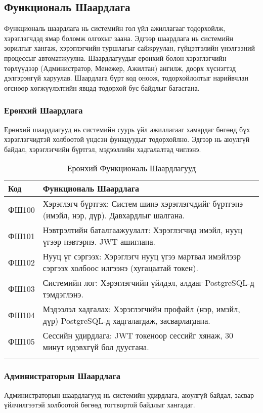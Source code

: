 \documentclass[a4paper]{report} %
\begin{document}
\subsection{Функциональ Шаардлага}
Функциональ шаардлага нь системийн гол үйл ажиллагааг тодорхойлж, хэрэглэгчдэд ямар боломж олгохыг заана. Эдгээр шаардлага нь системийн зорилгыг хангаж, хэрэглэгчийн туршлагыг сайжруулан, гүйцэтгэлийн үнэлгээний процессыг автоматжуулна. Шаардлагуудыг ерөнхий болон хэрэглэгчийн төрлүүдээр (Администратор, Менежер, Ажилтан) ангилж, доорх хүснэгтэд дэлгэрэнгүй харуулав. Шаардлага бүрт код оноож, тодорхойлолтыг нарийвчлан өгснөөр хөгжүүлэлтийн явцад тодорхой бус байдлыг багасгана.

\subsubsection{Ерөнхий Шаардлага}
Ерөнхий шаардлагууд нь системийн суурь үйл ажиллагааг хамардаг бөгөөд бүх хэрэглэгчидтэй холбоотой үндсэн функцуудыг тодорхойлно. Эдгээр нь аюулгүй байдал, хэрэглэгчийн бүртгэл, мэдээллийн хадгалалтад чиглэнэ.

\begin{longtable}{|p{2cm}|p{8.5cm}|}
\hline
\textbf{Код} & \textbf{Функциональ Шаардлага} \\ \hline
\endhead
ФШ100 & Хэрэглэгч бүртгэх: Систем шинэ хэрэглэгчдийг бүртгэнэ (имэйл, нэр, дүр). Давхардлыг шалгана. \\ \hline
ФШ101 & Нэвтрэлтийн баталгаажуулалт: Хэрэглэгчид имэйл, нууц үгээр нэвтэрнэ. JWT ашиглана. \\ \hline
ФШ102 & Нууц үг сэргээх: Хэрэглэгч нууц үгээ мартвал имэйлээр сэргээх холбоос илгээнэ (хугацаатай токен). \\ \hline
ФШ103 & Системийн лог: Хэрэглэгчийн үйлдэл, алдааг PostgreSQL-д тэмдэглэнэ. \\ \hline
ФШ104 & Мэдээлэл хадгалах: Хэрэглэгчийн профайл (нэр, имэйл, дүр) PostgreSQL-д хадгалагдаж, засварлагдана. \\ \hline
ФШ105 & Сессийн удирдлага: JWT токеноор сессийг хянаж, 30 минут идэвхгүй бол дуусгана. \\ \hline
\caption{Ерөнхий Функциональ Шаардлагууд} \label{tab:general_requirements}
\end{longtable}

\subsubsection{Администраторын Шаардлага}
Администраторын шаардлагууд нь системийн удирдлага, аюулгүй байдал, засвар үйлчилгээтэй холбоотой бөгөөд тогтвортой байдлыг хангадаг.
\end{document}
